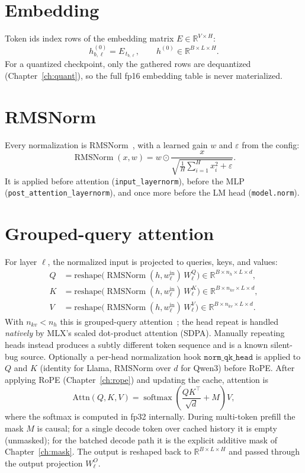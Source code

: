 \documentclass[11pt,a4paper]{report}
\newcommand{\R}{\mathbb{R}}
\newcommand{\code}[1]{\texttt{#1}}
\newcommand{\softmax}{\operatorname{softmax}}
\newcommand{\rmsnorm}{\operatorname{RMSNorm}}
\newcommand{\elemmul}{\odot}
\begin{document}
\section{Embedding}
Token ids index rows of the embedding matrix
$E \in \R^{V\times H}$:
\begin{equation}
  h^{(0)}_{b,\ell} = E_{\,t_{b,\ell}}, \qquad h^{(0)} \in \R^{B\times L\times H}.
\end{equation}
For a quantized checkpoint, only the gathered rows are dequantized
(Chapter~\ref{ch:quant}), so the full fp16 embedding table is never materialized.

\section{RMSNorm}
Every normalization is RMSNorm~\citep{zhang2019rmsnorm}, with a learned gain $w$ and
$\varepsilon$ from the config:
\begin{equation}
  \rmsnorm(x, w) = w \elemmul \frac{x}{\sqrt{\frac{1}{H}\sum_{i=1}^{H} x_i^2 + \varepsilon}}.
\end{equation}
It is applied before attention (\code{input\_layernorm}), before the MLP
(\code{post\_attention\_layernorm}), and once more before the LM head
(\code{model.norm}).

\section{Grouped-query attention}
\label{sec:gqa}
For layer $\ell$, the normalized input is projected to queries, keys, and values:
\begin{align}
  Q &= \text{reshape}\big(\rmsnorm(h, w^{\text{in}}_\ell)\,W^Q_\ell\big) \in \R^{B\times n_h\times L\times d},\\
  K &= \text{reshape}\big(\rmsnorm(h, w^{\text{in}}_\ell)\,W^K_\ell\big) \in \R^{B\times n_{kv}\times L\times d},\\
  V &= \text{reshape}\big(\rmsnorm(h, w^{\text{in}}_\ell)\,W^V_\ell\big) \in \R^{B\times n_{kv}\times L\times d}.
\end{align}
With $n_{kv} < n_h$ this is grouped-query attention~\citep{ainslie2023gqa}; the head
repeat is handled \emph{natively} by MLX's scaled dot-product attention (SDPA).
Manually repeating heads instead produces a subtly different token sequence and is a
known silent-bug source. Optionally a per-head normalization hook
$\code{norm\_qk\_head}$ is applied to $Q$ and $K$ (identity for Llama, RMSNorm over
$d$ for Qwen3) before RoPE. After applying RoPE (Chapter~\ref{ch:rope}) and updating
the cache, attention is
\begin{equation}
  \text{Attn}(Q,K,V) = \softmax\!\left(\frac{QK^\top}{\sqrt{d}} + M\right)V,
\end{equation}
where the softmax is computed in fp32 internally. During multi-token prefill the
mask $M$ is causal; for a single decode token over cached history it is empty
(unmasked); for the batched decode path it is the explicit additive mask of
Chapter~\ref{ch:mask}. The output is reshaped back to $\R^{B\times L\times H}$ and
passed through the output projection $W^O_\ell$.
\end{document}
